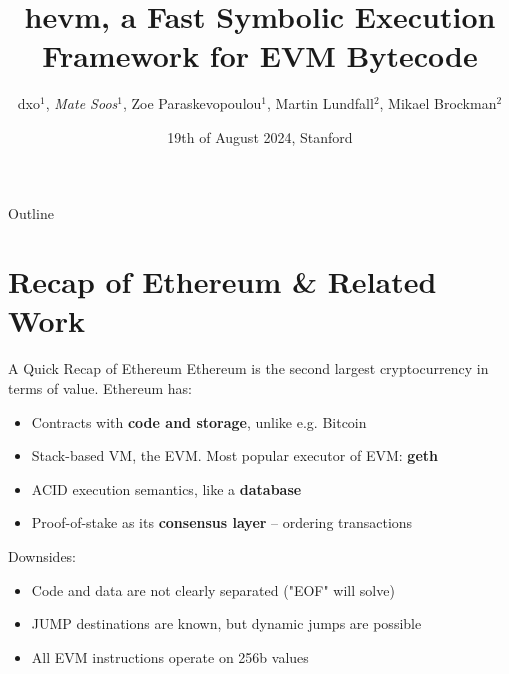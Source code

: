 \documentclass[aspectratio=169]{beamer}
\title[hevm]{hevm, a Fast Symbolic Execution Framework for EVM Bytecode}
\author[dxo, Soos, Paraskevopoulou, Lundfall, Brockmann]{dxo$^{1}$, \emph{Mate Soos$^{1}$}, Zoe Paraskevopoulou$^{1}$, Martin Lundfall$^{2}$, Mikael Brockman$^{2}$}
\institute[]{$^{1}$ Ethereum Foundation, $^{2}$ Independent Researcher}
\date{19th of August 2024, Stanford}
\begin{document}
\begin{frame}
    \titlepage 
\end{frame}

%

\begin{frame}{Outline}
    \tableofcontents
\end{frame}

\section{Recap of Ethereum \& Related Work}

\begin{frame}{A Quick Recap of Ethereum}
Ethereum is the second largest cryptocurrency in terms of value. Ethereum has:
\begin{itemize}
\item Contracts with \textbf{code and storage}, unlike e.g. Bitcoin
\item Stack-based VM, the EVM. Most popular executor of EVM: \textbf{geth}
\item ACID execution semantics, like a \textbf{database}
\item Proof-of-stake as its \textbf{consensus layer} -- ordering transactions
\end{itemize}

Downsides:
\begin{itemize}
\item Code and data are not clearly separated ("EOF" will solve)
\item JUMP destinations are known, but dynamic jumps are possible
\item All EVM instructions operate on 256b values
\end{itemize}

\end{frame}
\end{document}
